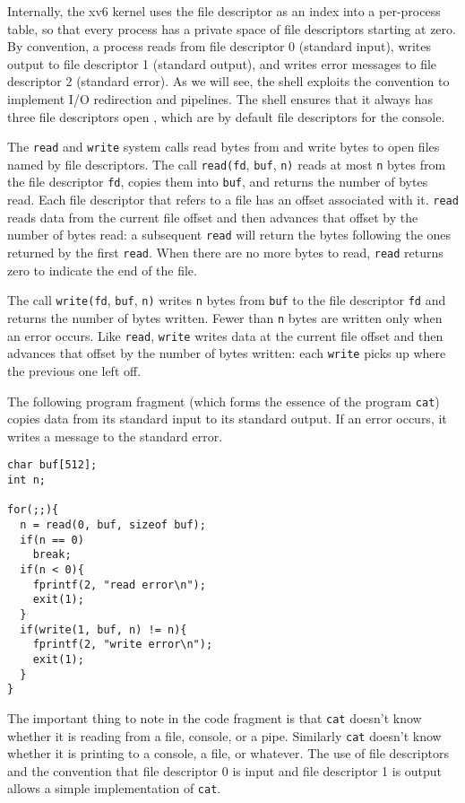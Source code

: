 Internally, the xv6 kernel uses the file descriptor
as an index into a per-process table,
so that every process has a private space of file descriptors
starting at zero.
By convention, a process reads from file descriptor 0 (standard input),
writes output to file descriptor 1 (standard output), and
writes error messages to file descriptor 2 (standard error).
As we will see, the shell exploits the convention to implement I/O redirection
and pipelines. The shell ensures that it always has three file descriptors
open
,
which are by default file descriptors for the console.

The
\lstinline{read}
and
\lstinline{write}
system calls read bytes from and write bytes to
open files named by file descriptors.
The call
\lstinline{read(fd},
\lstinline{buf},
\lstinline{n)}
reads at most
\lstinline{n}
bytes from the file descriptor
\lstinline{fd},
copies them into
\lstinline{buf},
and returns the number of bytes read.
Each file descriptor that refers to a file
has an offset associated with it.
\lstinline{read}
reads data from the current file offset and then advances
that offset by the number of bytes read:
a subsequent
\lstinline{read}
will return the bytes following the ones returned by the first
\lstinline{read}.
When there are no more bytes to read,
\lstinline{read}
returns zero to indicate the end of the file.

The call
\lstinline{write(fd},
\lstinline{buf},
\lstinline{n)}
writes
\lstinline{n}
bytes from
\lstinline{buf}
to the file descriptor
\lstinline{fd}
and returns the number of bytes written.
Fewer than
\lstinline{n}
bytes are written only when an error occurs.
Like
\lstinline{read},
\lstinline{write}
writes data at the current file offset and then advances
that offset by the number of bytes written:
each
\lstinline{write}
picks up where the previous one left off.

The following program fragment (which forms the essence of the program
\lstinline{cat})
copies data from its standard input
to its standard output.  If an error occurs, it writes a message
to the standard error.
\begin{lstlisting}[]
char buf[512];
int n;

for(;;){
  n = read(0, buf, sizeof buf);
  if(n == 0)
    break;
  if(n < 0){
    fprintf(2, "read error\n");
    exit(1);
  }
  if(write(1, buf, n) != n){
    fprintf(2, "write error\n");
    exit(1);
  }
}
\end{lstlisting}
The important thing to note in the code fragment is that
\lstinline{cat}
doesn't know whether it is reading from a file, console, or a pipe.
Similarly 
\lstinline{cat}
doesn't know whether it is printing to a console, a file, or whatever.
The use of file descriptors and the convention that file descriptor 0
is input and file descriptor 1 is output allows a simple
implementation
of 
\lstinline{cat}.

